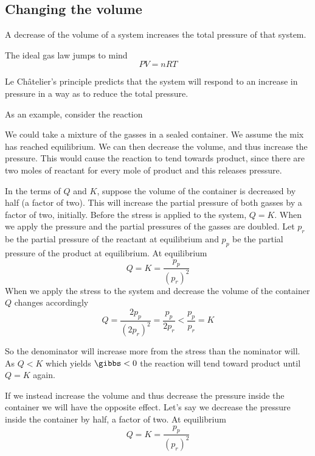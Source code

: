 \documentclass[../mit-general-chemistry.tex]{subfiles}
\begin{document}
\subsection{Changing the volume}


A decrease of the volume of a system increases the total pressure of
that system.

The ideal gas law jumps to mind
\begin{equation}
  PV = nRT
\end{equation}

Le Châtelier's principle predicts that the system will respond to an
increase in pressure in a way as to reduce the total pressure.


As an example, consider the reaction 

We could take a mixture of the gasses in a sealed container. We
assume the mix has reached equilibrium. We can then decrease the
volume, and thus increase the pressure. This would cause the
reaction to tend towards product, since there are two moles of
reactant for every mole of product and this releases pressure.


In the terms of $Q$ and $K$, suppose the volume of the container is
decreased by half (a factor of two). This will increase the partial
pressure of both gasses by a factor of two, initially. Before the
stress is applied to the system, $Q = K$. When we apply the pressure
and the partial pressures of the gasses are doubled. Let $p_r$ be the
partial pressure of the reactant at equilibrium and $p_p$ be the
partial pressure of the product at equilibrium. At equilibrium
\begin{equation*}
  Q = K = \frac{p_p}{(p_r)^2}
\end{equation*}
When we apply the stress to the system and decrease the volume of the
container $Q$ changes accordingly
\begin{equation*}
  Q = \frac{2p_p}{(2p_r)^2} = \frac{p_p}{2p_r} < \frac{p_p}{p_r} = K
\end{equation*}

So the denominator will increase more from the stress than the
nominator will. As $Q < K$ which yields $\gibbs < 0$ the reaction will
tend toward product until $Q = K$ again.

If we instead increase the volume and thus decrease the pressure
inside the container we will have the opposite effect. Let's say we
decrease the pressure inside the container by half, a factor of
two. At equilibrium
\begin{equation*}
  Q = K = \frac{p_p}{(p_r)^2}
\end{equation*}
\end{document}
